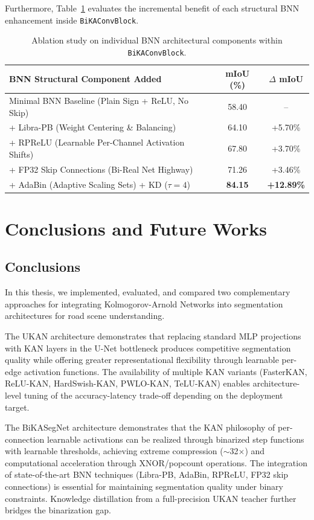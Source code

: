 \documentclass[a4paper]{report}
\begin{document}
Furthermore, Table~\ref{tab:bnn_components_ablation} evaluates the incremental benefit of each structural BNN enhancement inside \texttt{BiKAConvBlock}.

\begin{table}[h!]
\centering
\small
\begin{tabular}{lcc}
\toprule
\textbf{BNN Structural Component Added} & \textbf{mIoU (\%)} & \textbf{$\Delta$ mIoU} \\
\midrule
Minimal BNN Baseline (Plain Sign + ReLU, No Skip) & 58.40 & -- \\
+ Libra-PB (Weight Centering \& Balancing) & 64.10 & +5.70\% \\
+ RPReLU (Learnable Per-Channel Activation Shifts) & 67.80 & +3.70\% \\
+ FP32 Skip Connections (Bi-Real Net Highway) & 71.26 & +3.46\% \\
+ AdaBin (Adaptive Scaling Sets) + KD ($\tau=4$) & \textbf{84.15} & \textbf{+12.89\%} \\
\bottomrule
\end{tabular}
\caption{Ablation study on individual BNN architectural components within \texttt{BiKAConvBlock}.}
\label{tab:bnn_components_ablation}
\end{table}




\chapter{Conclusions and Future Works}

\section{Conclusions}
In this thesis, we implemented, evaluated, and compared two complementary approaches for integrating Kolmogorov-Arnold Networks into segmentation architectures for road scene understanding.

The UKAN architecture demonstrates that replacing standard MLP projections with KAN layers in the U-Net bottleneck produces competitive segmentation quality while offering greater representational flexibility through learnable per-edge activation functions. The availability of multiple KAN variants (FasterKAN, ReLU-KAN, HardSwish-KAN, PWLO-KAN, TeLU-KAN) enables architecture-level tuning of the accuracy-latency trade-off depending on the deployment target.

The BiKASegNet architecture demonstrates that the KAN philosophy of per-connection learnable activations can be realized through binarized step functions with learnable thresholds, achieving extreme compression ($\sim$32$\times$) and computational acceleration through XNOR/popcount operations. The integration of state-of-the-art BNN techniques (Libra-PB, AdaBin, RPReLU, FP32 skip connections) is essential for maintaining segmentation quality under binary constraints. Knowledge distillation from a full-precision UKAN teacher further bridges the binarization gap.
\end{document}
